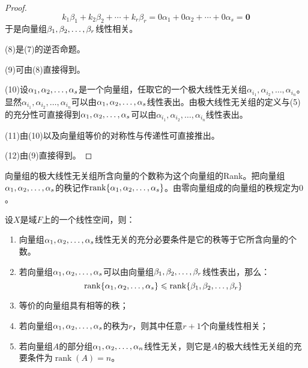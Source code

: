 \begin{proof}
\begin{equation*}
		k_1\beta_1+k_2\beta_2+\cdots+k_r\beta_r=0\alpha_1+0\alpha_2+\cdots+0\alpha_s=\mathbf{0}
	\end{equation*}
	于是向量组$\beta_1, \beta_2, \dots, \beta_{r}$线性相关。\par
	(8)是(7)的逆否命题。\par
	(9)可由(8)直接得到。\par
	(10)设$\alpha_1, \alpha_2, \dots, \alpha_{s}$是一个向量组，任取它的一个极大线性无关组$\alpha_{i_1},\alpha_{i_2},\dots,\alpha_{i_n}$。显然$\alpha_{i_1},\alpha_{i_2},\dots,\alpha_{i_n}$可以由$\alpha_1, \alpha_2, \dots, \alpha_{s}$线性表出。由极大线性无关组的定义与(5)的充分性可直接得到$\alpha_1, \alpha_2, \dots, \alpha_{s}$可以由$\alpha_{i_1},\alpha_{i_2},\dots,\alpha_{i_n}$线性表出。\par
	(11)由(10)以及向量组等价的对称性与传递性可直接推出。\par
	(12)由(9)直接得到。
\end{proof}
\begin{definition}
	向量组的极大线性无关组所含向量的个数称为这个向量组的\gls{Rank}。把向量组$\alpha_1, \alpha_2, \dots, \alpha_{s}$的秩记作$\operatorname{rank}\{\alpha_1, \alpha_2, \dots, \alpha_{s}\}$。由零向量组成的向量组的秩规定为$0$。
\end{definition}
\begin{property}\label{prop:Rank}
	设$X$是域$F$上的一个线性空间，则：
	\begin{enumerate}
		\item 向量组$\alpha_1, \alpha_2, \dots, \alpha_{s}$线性无关的充分必要条件是它的秩等于它所含向量的个数。
		\item 若向量组$\alpha_1, \alpha_2, \dots, \alpha_{s}$可以由向量组$\beta_1, \beta_2, \dots, \beta_{r}$线性表出，那么：
		\begin{equation*}
			\operatorname{rank}\{\alpha_1, \alpha_2, \dots, \alpha_{s}\}\leqslant\operatorname{rank}\{\beta_1, \beta_2, \dots, \beta_{r}\}
		\end{equation*}
		\item 等价的向量组具有相等的秩；
		\item 若向量组$\alpha_1, \alpha_2, \dots, \alpha_{s}$的秩为$r$，则其中任意$r+1$个向量线性相关；
		\item 若向量组$A$的部分组$\alpha_1, \alpha_2, \dots, \alpha_{n}$线性无关，则它是$A$的极大线性无关组的充要条件为$\operatorname{rank}(A)=n$。
	\end{enumerate}
\end{property}
